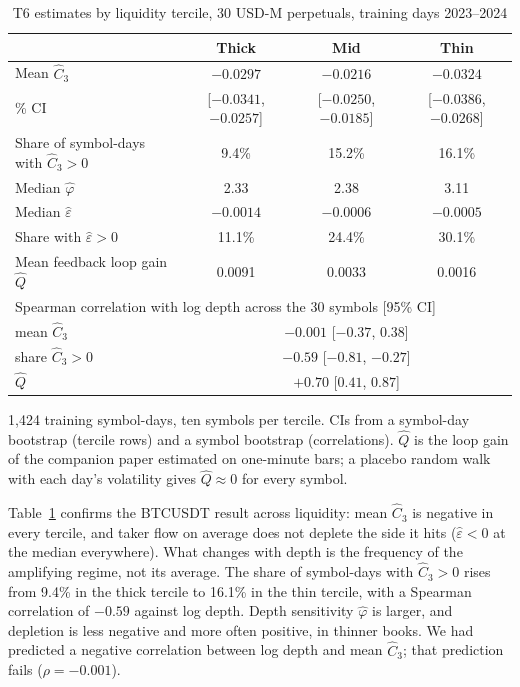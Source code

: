 \documentclass[12pt]{article}
\theoremstyle{definition}
\theoremstyle{remark}
\begin{document}
\begin{table}[t]\centering
\begin{threeparttable}
\caption{T6 estimates by liquidity tercile, 30 USD-M perpetuals, training days 2023--2024}\label{tab:x3}
\small\setlength{\tabcolsep}{5pt}
\begin{tabular}{lccc}
\toprule
 & Thick & Mid & Thin\\
\midrule
Mean $\hat C_3$ & $-0.0297$ & $-0.0216$ & $-0.0324$\\
\quad 95\% CI & [$-0.0341$, $-0.0257$] & [$-0.0250$, $-0.0185$] & [$-0.0386$, $-0.0268$]\\
Share of symbol-days with $\hat C_3>0$ & 9.4\% & 15.2\% & 16.1\%\\
Median $\hat\varphi$ & 2.33 & 2.38 & 3.11\\
Median $\hat\varepsilon$ & $-0.0014$ & $-0.0006$ & $-0.0005$\\
Share with $\hat\varepsilon>0$ & 11.1\% & 24.4\% & 30.1\%\\
Mean feedback loop gain $\hat Q$ & 0.0091 & 0.0033 & 0.0016\\
\midrule
\multicolumn{4}{l}{Spearman correlation with log depth across the 30 symbols [95\% CI]}\\
\quad mean $\hat C_3$ & \multicolumn{3}{c}{$-0.001$ [$-0.37$, $0.38$]}\\
\quad share $\hat C_3>0$ & \multicolumn{3}{c}{$-0.59$ [$-0.81$, $-0.27$]}\\
\quad $\hat Q$ & \multicolumn{3}{c}{$+0.70$ [$0.41$, $0.87$]}\\
\bottomrule
\end{tabular}
\begin{tablenotes}\footnotesize\item 1{,}424 training symbol-days, ten symbols per tercile. CIs from a symbol-day bootstrap (tercile rows) and a symbol bootstrap (correlations). $\hat Q$ is the loop gain of the companion paper estimated on one-minute bars; a placebo random walk with each day's volatility gives $\hat Q\approx0$ for every symbol. \end{tablenotes}
\end{threeparttable}
\end{table}

Table~\ref{tab:x3} confirms the BTCUSDT result across liquidity: mean $\hat C_3$ is negative in every tercile, and taker flow on average does not deplete the side it hits ($\hat\varepsilon<0$ at the median everywhere). What changes with depth is the frequency of the amplifying regime, not its average. The share of symbol-days with $\hat C_3>0$ rises from 9.4\% in the thick tercile to 16.1\% in the thin tercile, with a Spearman correlation of $-0.59$ against log depth. Depth sensitivity $\hat\varphi$ is larger, and depletion is less negative and more often positive, in thinner books. We had predicted a negative correlation between log depth and mean $\hat C_3$; that prediction fails ($\rho=-0.001$).
\end{document}
